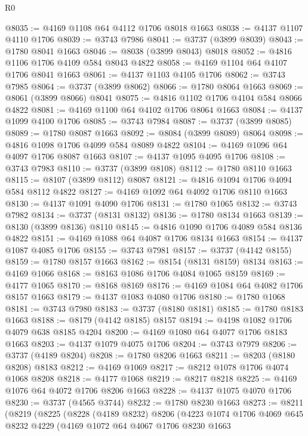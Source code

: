 \begin{lexlean}{R0}
\begin{coremodule}
@8035 := @4169 @1108 @64 @4112 @1706 @8018 @1663
@8038 := @4137 @1107 @4110 @1706
@8039 := @3743 @7986
@8041 := @3737 (@3899 @8039)
@8043 := @1780 @8041 @1663
@8046 := @8038 (@3899 @8043) @8018
@8052 := @4816 @1106 @1706 @4109 @584 @8043 @4822
@8058 := @4169 @1104 @64 @4107 @1706 @8041 @1663
@8061 := @4137 @1103 @4105 @1706
@8062 := @3743 @7985
@8064 := @3737 (@3899 @8062)
@8066 := @1780 @8064 @1663
@8069 := @8061 (@3899 @8066) @8041
@8075 := @4816 @1102 @1706 @4104 @584 @8066 @4822
@8081 := @4169 @1100 @64 @4102 @1706 @8064 @1663
@8084 := @4137 @1099 @4100 @1706
@8085 := @3743 @7984
@8087 := @3737 (@3899 @8085)
@8089 := @1780 @8087 @1663
@8092 := @8084 (@3899 @8089) @8064
@8098 := @4816 @1098 @1706 @4099 @584 @8089 @4822
@8104 := @4169 @1096 @64 @4097 @1706 @8087 @1663
@8107 := @4137 @1095 @4095 @1706
@8108 := @3743 @7983
@8110 := @3737 (@3899 @8108)
@8112 := @1780 @8110 @1663
@8115 := @8107 (@3899 @8112) @8087
@8121 := @4816 @1094 @1706 @4094 @584 @8112 @4822
@8127 := @4169 @1092 @64 @4092 @1706 @8110 @1663
@8130 := @4137 @1091 @4090 @1706
@8131 := @1780 @1065
@8132 := @3743 @7982
@8134 := @3737 (@8131 @8132)
@8136 := @1780 @8134 @1663
@8139 := @8130 (@3899 @8136) @8110
@8145 := @4816 @1090 @1706 @4089 @584 @8136 @4822
@8151 := @4169 @1088 @64 @4087 @1706 @8134 @1663
@8154 := @4137 @1087 @4085 @1706
@8155 := @3743 @7981
@8157 := @3737 (@4142 @8155)
@8159 := @1780 @8157 @1663
@8162 := @8154 (@8131 @8159) @8134
@8163 := @4169 @1066
@8168 := @8163 @1086 @1706 @4084 @1065 @8159
@8169 := @4177 @1065
@8170 := @8168 @8169
@8176 := @4169 @1084 @64 @4082 @1706 @8157 @1663
@8179 := @4137 @1083 @4080 @1706
@8180 := @1780 @1068
@8181 := @3743 @7980
@8183 := @3737 (@8180 @8181)
@8185 := @1780 @8183 @1663
@8188 := @8179 (@4142 @8185) @8157
@8194 := @4198 @1082 @1706 @4079 @638 @8185 @4204
@8200 := @4169 @1080 @64 @4077 @1706 @8183 @1663
@8203 := @4137 @1079 @4075 @1706
@8204 := @3743 @7979
@8206 := @3737 (@4189 @8204)
@8208 := @1780 @8206 @1663
@8211 := @8203 (@8180 @8208) @8183
@8212 := @4169 @1069
@8217 := @8212 @1078 @1706 @4074 @1068 @8208
@8218 := @4177 @1068
@8219 := @8217 @8218
@8225 := @4169 @1076 @64 @4072 @1706 @8206 @1663
@8228 := @4137 @1075 @4070 @1706
@8230 := @3737 (@4565 @3744)
@8232 := @1780 @8230 @1663
@8273 := @8211
    (@8219
      (@8225
        (@8228
          (@4189 @8232)
          @8206
          (@4223
            @1074
            @1706
            @4069
            @645
            @8232
            @4229
            (@4169
              @1072
              @64
              @4067
              @1706
              @8230
              @1663

\end{coremodule}
\end{lexlean}
